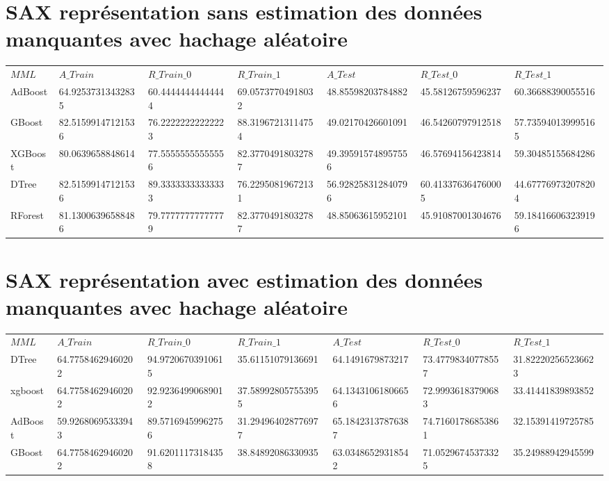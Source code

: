 \documentclass{report}
\begin{document}
	\section*{SAX représentation sans estimation des données manquantes avec hachage aléatoire}
	\begin{table}[H]
		\begin{tabular} {|l|l|l|l|l|l|l|}
			\hline
			$MML$&$A\_Train$ & $R\_Train\_0 $ & $R\_Train\_1$ & $A\_Test$ & $R\_Test\_0 $ & $R\_Test\_1$\\	
			AdBoost & 64.92537313432835 & 60.44444444444444 & 69.05737704918032 & 48.85598203784882 & 45.58126759596237 & 60.36688390055516 \\
			\hline
			GBoost & 82.51599147121536 & 76.22222222222223 & 88.31967213114754 & 49.02170426601091 & 46.54260797912518 & 57.735940139995165 \\
			\hline
			XGBoost & 80.0639658848614 & 77.55555555555556 & 82.37704918032787 & 49.395915748957556 & 46.57694156423814 & 59.30485155684286 \\
			\hline
			DTree & 82.51599147121536 & 89.33333333333333 & 76.22950819672131 & 56.928258312840796 & 60.413376364760005 & 44.677769732078204 \\
			\hline
			RForest & 81.13006396588486 & 79.77777777777779 & 82.37704918032787 & 48.85063615952101 & 45.91087001304676 & 59.184166063239196 \\		
			\hline
		\end{tabular}
	\end{table}

	\section*{SAX représentation avec estimation des données manquantes avec hachage aléatoire}
		\begin{table}[H]
		\begin{tabular} {|l|l|l|l|l|l|l|}
			\hline
			$MML$&$A\_Train$ & $R\_Train\_0 $ & $R\_Train\_1$ & $A\_Test$ & $R\_Test\_0 $ & $R\_Test\_1$\\
			DTree & 64.77584629460202 & 94.97206703910615 & 35.61151079136691 & 64.1491679873217 & 73.47798340778557 & 31.822202565236623 \\
			\hline
			xgboost & 64.77584629460202 & 92.92364990689012 & 37.589928057553955 & 64.13431061806656 & 72.99936183790683 & 33.41441839893852 \\
			\hline
			AdBoost & 59.92680695333943 &  89.57169459962756 & 31.294964028776977 & 65.18423137876387 &  74.71601786853861 & 32.15391419725785 \\
			\hline
			GBoost & 64.77584629460202 & 91.62011173184358 & 38.84892086330935 & 63.03486529318542 & 71.05296745373325 & 35.24988942945599 \\			
			\hline
		\end{tabular}
	\end{table}
\end{document}
